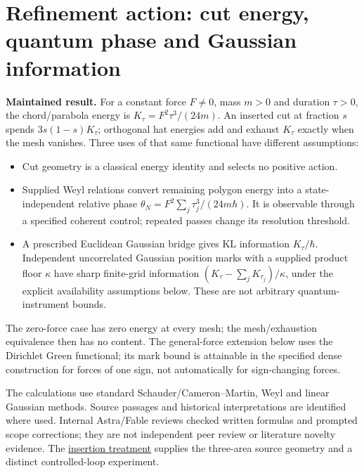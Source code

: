 \documentclass[11pt,a4paper]{article}
\newcommand{\tightlist}{\setlength{\itemsep}{0pt}\setlength{\parskip}{0pt}}
\begin{document}
\hypertarget{refinement-action-cut-energy-quantum-phase-and-gaussian-information}{%
\section{Refinement action: cut energy, quantum phase and Gaussian
information}\label{refinement-action-cut-energy-quantum-phase-and-gaussian-information}}

\textbf{Maintained result.} For a constant force \(F\ne0\), mass \(m>0\)
and duration \(\tau>0\), the chord/parabola energy is
\(K_\tau=F^2\tau^3/(24m)\). An inserted cut at fraction \(s\) spends
\(3s(1-s)K_\tau\); orthogonal hat energies add and exhaust \(K_\tau\)
exactly when the mesh vanishes. Three uses of that same functional have
different assumptions:

\begin{itemize}
\tightlist
\item
  Cut geometry is a classical energy identity and selects no positive
  action.
\item
  Supplied Weyl relations convert remaining polygon energy into a
  state-independent relative phase
  \(\theta_N=F^2\sum_j\tau_j^3/(24m\hbar)\). It is observable through a
  specified coherent control; repeated passes change its resolution
  threshold.
\item
  A prescribed Euclidean Gaussian bridge gives KL information
  \(K_\tau/\hbar\). Independent uncorrelated Gaussian position marks
  with a supplied product floor \(\kappa\) have sharp finite-grid
  information \((K_\tau-\sum_jK_{\tau_j})/\kappa\), under the explicit
  availability assumptions below. These are not arbitrary
  quantum-instrument bounds.
\end{itemize}

The zero-force case has zero energy at every mesh; the mesh/exhaustion
equivalence then has no content. The general-force extension below uses
the Dirichlet Green functional; its mark bound is attainable in the
specified dense construction for forces of one sign, not automatically
for sign-changing forces.

The calculations use standard Schauder/Cameron--Martin, Weyl and linear
Gaussian methods. Source passages and historical interpretations are
identified where used. Internal Astra/Fable reviews checked written
formulas and prompted scope corrections; they are not independent peer
review or literature novelty evidence. The
\href{newton-insertion-action.md}{insertion treatment} supplies the
three-area source geometry and a distinct controlled-loop experiment.
\end{document}
